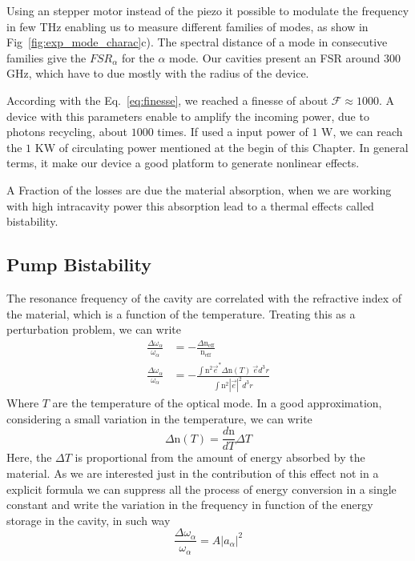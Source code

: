 Using an stepper motor instead of the piezo it possible to modulate the frequency in few THz enabling us to measure different families of modes, as show in Fig~\ref{fig:exp_mode_charac}c). The spectral distance of a mode in consecutive families give the $FSR_\alpha$ for the $\alpha$ mode. Our cavities present an FSR around $300$ GHz, which have to due mostly with the radius of the device. 

According with the Eq.~\ref{eq:finesse}, we reached a finesse of about $\mathcal{F} \approx 1000$. A device with this parameters enable to amplify the incoming power, due to photons recycling, about $1000$ times. If used a input power of $1$ W, we can reach the $1$ KW of circulating power mentioned at the begin of this Chapter. In general terms, it make our device a good platform to generate nonlinear effects. 

A Fraction of the losses are due the material absorption, when we are working with high intracavity power this absorption lead to a thermal effects called bistability. 

\subsection{Pump Bistability}
The resonance frequency of the cavity are correlated with the refractive index of the material, which is a function of the temperature. Treating this as a perturbation problem, we can write 
\begin{subequations}
    \begin{alignat}{2}
        \frac{\Delta\omega_\alpha}{\omega_\alpha} &= -\frac{\Delta \text{n}_\text{eff}}{\text{n}_\text{eff}}\\
        \frac{\Delta\omega_\alpha}{\omega_\alpha} &= -\frac{\int \text{n}^2\vec{e}^*\Delta\text{n}(T)~\vec{e} d^3r}
        {\int \text{n}^2 |\vec{e}|^2 d^3r}
    \end{alignat}
\end{subequations}
Where $T$ are the temperature of the optical mode. In a good approximation, considering a small variation in the temperature, we can write
\begin{equation}
    \Delta \text{n}(T) = \frac{d\text{n}}{dT}\Delta T
\end{equation}
Here, the $\Delta T$ is proportional from the amount of energy absorbed by the material. As we are interested just in the contribution of this effect not in a explicit formula we can suppress all the process of energy conversion in a single constant and write the variation in the frequency in function of the energy storage in the cavity, in such way
\begin{equation}
\frac{\Delta \omega_\alpha}{\omega_\alpha} = A |a_\alpha|^2
\label{eq:pertubation_bistaliti_cavity}
\end{equation}   

